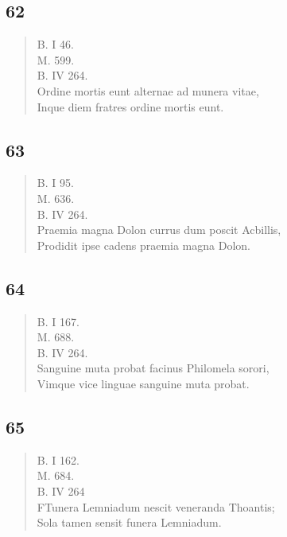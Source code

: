 \documentclass[11pt, a4paper]{report}
\begin{document}
            \subsection*{62}
      \begin{verse}
      B. I 46. \\ M. 599. \\ B. IV 264. \\ Ordine mortis eunt alternae ad munera vitae, \\ Inque diem fratres ordine mortis eunt. \\ 
      \end{verse}
  
            \subsection*{63}
      \begin{verse}
      B. I 95. \\ M. 636. \\ B. IV 264. \\ Praemia magna Dolon currus dum poscit Acbillis, \\ Prodidit ipse cadens praemia magna Dolon. \\ 
      \end{verse}
  
            \subsection*{64}
      \begin{verse}
      B. I 167. \\ M. 688. \\ B. IV 264. \\ Sanguine muta probat facinus Philomela sorori, \\ Vimque vice linguae sanguine muta probat. \\ 
      \end{verse}
  
            \subsection*{65}
      \begin{verse}
      B. I 162. \\ M. 684. \\ B. IV 264 \\ FTunera Lemniadum nescit veneranda Thoantis; \\ Sola tamen sensit funera Lemniadum. \\ 
      \end{verse}
  
\end{document}

